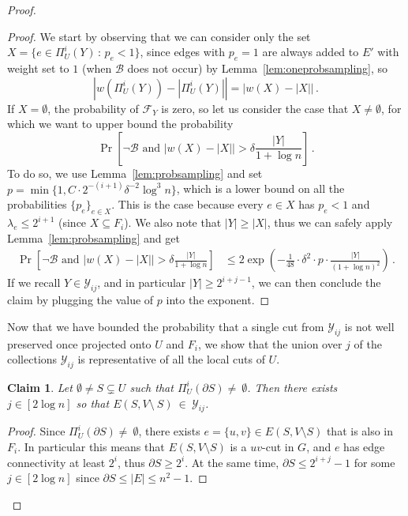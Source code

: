 \documentclass[epsfig,letter,11pt]{article}
\numberwithin{equation}{section}
\newcommand{\uncutg}[1]{{\partial} #1}
\newtheorem{claim}[theorem]{Claim}
\begin{document}
\begin{proof}
\begin{proof}
	We start by observing that we can consider only the set $X = \{e \in \Pi_U^i(Y) \, : \, p_e < 1\}$, since edges with $p_e=1$ are always added to $E'$ with weight set to $1$ (when $ \mathcal{B}$ does not occur) by Lemma~\ref{lem:oneprobsampling}, so
	\begin{equation*}
		\left|w(\Pi_U^{i}(Y)) - |\Pi_U^{i}(Y)|\right| = \left|w(X) - |X|\right| \, .
	\end{equation*}
	If $X = \emptyset$, the probability of $\mathcal{F}_Y$ is zero, so let us consider the case that $X \neq \emptyset$, for which we want to upper bound the probability
	\begin{equation*}
		\Pr\left[\neg \mathcal{B} \text{ and } \left|w(X) - |X|\right| > \delta \frac{|Y|}{1+\log n}\right] \, .
	\end{equation*}
	\noindent
	To do so, we use Lemma~\ref{lem:probsampling} and set $p=\min \{1, C \cdot 2^{-(i+1)} \delta^{-2} \log^3 n\}$, which is a lower bound on all the probabilities $\{p_e\}_{e \in X}$. This is the case because every $e \in X$ has $p_e < 1$ and $\lambda_e \le 2^{i+1}$ (since $X \subseteq F_i$). We also note that $|Y| \ge |X|$, thus we can safely apply Lemma~\ref{lem:probsampling} and get
	\begin{align*}
		\Pr\left[\neg \mathcal{B} \text{ and } \left|w(X) - |X|\right| > \delta \frac{|Y|}{1+\log n}\right] & \le 2 \exp\left(-\frac{1}{48}\cdot \delta^2 \cdot p \cdot \frac{|Y|}{(1+\log n)^2} \right) \, .
	\end{align*}
	If we recall $Y \in \mathcal{Y}_{ij}$, and in particular $|Y| \ge 2^{i+j-1}$, we can then conclude the claim by plugging the value of $p$ into the exponent.
\end{proof}
\noindent
Now that we have bounded the probability that a single cut from $\mathcal{Y}_{ij}$ is not well preserved once projected onto $U$ and $F_i$, we show that the union over $j$ of the collections $\mathcal{Y}_{ij}$ is representative of all the local cuts of $U$.
\begin{claim}
	\label{claim:calyisenough}
	Let $\emptyset \neq S \subsetneq U$ such that $\Pi_U^i(\uncutg{S})\neq~\emptyset$. Then there exists $j \in [2\log n]$ so that $ E(S,V \setminus~S)~\in~\mathcal{Y}_{ij}$.
\end{claim}
\begin{proof}
	Since $\Pi_U^i(\uncutg{S}) \neq~\emptyset$, there exists $e=\{u,v\} \in E(S,V\setminus S)$ that is also in $F_i$. In particular this means that $E(S,V\setminus S)$ is a $uv$-cut in $G$, and $e$ has edge connectivity at least $2^i$, thus $\uncutg{S} \ge 2^{i}$. At the same time, $\uncutg{S} \le 2^{i+j}-1$ for some $j \in [2\log n]$ since $\uncutg{S} \le |E| \le n^2-1$.

\end{proof}
\end{proof}
\end{document}
